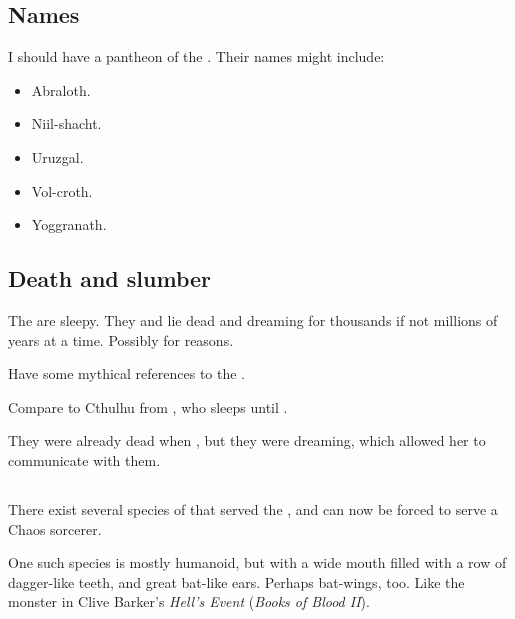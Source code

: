 \subsection{Names}
I should have a pantheon of the . Their names might include: 

\begin{itemize}
  \item Abraloth. 
  \item Niil-shacht.
  \item Uruzgal. 
  \item Vol-croth. 
  \item Yoggranath. 
\end{itemize}










\subsection{Death and slumber}
\label{\xsic{} slumber}
\label{Dead \xss}
The \xss{} are sleepy. They  and lie dead and dreaming for thousands if not millions of years at a time. 
Possibly for  reasons. 

Have some mythical references to the .

Compare to Cthulhu from , who sleeps until . 

They were already dead when , but they were dreaming, which allowed her to communicate with them.







\subsection{\ThzanTzaic{} \pdaemons}
There exist several species of \pdaemons{} that served the \thzantzais, and can now be forced to serve a Chaos sorcerer. 

One such species is mostly humanoid, but with a wide mouth filled with a row of dagger-like teeth, and great bat-like ears. Perhaps bat-wings, too. Like the monster in Clive Barker's \emph{Hell's Event} (\emph{Books of Blood II}).







